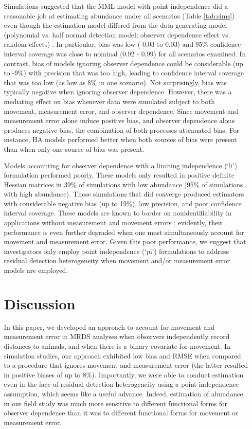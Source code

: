 \documentclass[aoas,preprint]{imsart}
\numberwithin{equation}{section}
\theoremstyle{plain}
\begin{document}
Simulations suggested that the MML model with point independence did a reasonable job at estimating abundance under all scenarios (Table \ref{tab:sims}) even though the estimation model differed from the data generating model (polynomial vs. half normal detection model; observer dependence effect vs. random effects) .  In particular, bias was low (-0.03 to 0.03) and 95\% confidence interval coverage was close to nominal (0.92 - 0.99) for all scenarios examined.  In contrast, bias of models ignoring observer dependence could be considerable (up to -9\%) with precision that was too high, leading to confidence interval coverage that was too low (as low as 8\% in one scenario).  Not surprisingly, bias was typically negative when ignoring observer dependence. However, there was a mediating effect on bias whenever data were simulated subject to both movement, measurement error, and observer dependence.  Since movement and measurement error alone induce positive bias, and observer dependence alone produces negative bias, the combination of both processes attenuated bias. For instance, HA models performed better when both sources of bias were present than when only one source of bias was present.

Models accounting for observer dependence with a limiting independence (`li') formulation performed poorly.  These models only resulted in positive definite Hessian matrices in 39\% of simulations with low abundance (95\% of simulations with high abundance).  Those simulations that did converge produced estimators with considerable negative bias (up to 19\%), low precision, and poor confidence interval coverage.  These models are known to border on nonidentifiability in applications without measurement and movement errors \citep{BucklandEtAl2010,MacKenzieClement2016}; evidently, their performance is even further degraded when one must simultaneously account for movement and measurement error.  Given this poor performance, we suggest that investigators only employ point independence (`pi') formulations to address residual detection heterogeneity when movement and/or measurement error models are employed.


\section{Discussion}

In this paper, we developed an approach to account for movement and measurement error in MRDS analyses when observers independently record distances to animals, and when there is a binary covariate for movement. In simulation studies, our approach exhibited low bias and RMSE when compared to a procedure that ignores movement and measurement error (the latter resulted in positive biases of up to 8\%).  Importantly, we were able to conduct estimation even in the face of residual detection heterogeneity using a point independence assumption, which seems like a useful advance. Indeed, estimation of abundance in our field study was much more sensitive to different functional forms for observer dependence than it was to different functional forms for movement or measurement error.
\end{document}
